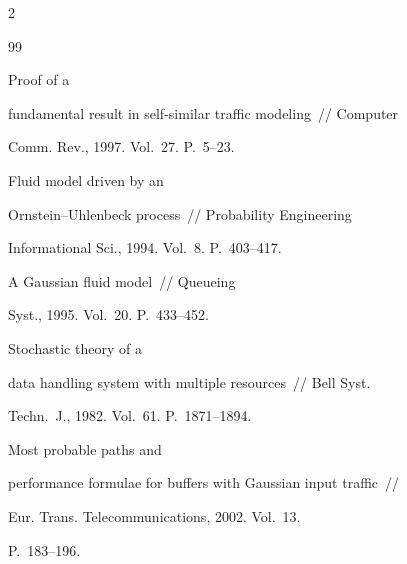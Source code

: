 \begin{multicols}{2}
{{\begin{thebibliography}{99}


 Proof of a


fundamental result in self-similar traffic modeling~// Computer


Comm. Rev., 1997. Vol.~27. P.~5--23.










 Fluid model driven by an


Ornstein--Uhlenbeck process~// Probability  Engineering 


Informational Sci., 1994. Vol.~8. P.~403--417.







 A Gaussian fluid model~// Queueing


Syst., 1995. Vol.~20. P.~433--452.







 Stochastic theory of a


data handling system with multiple resources~// Bell Syst.


Techn.~J., 1982. Vol.~61. P.~1871--1894.





\label{end\stat}







 Most probable paths and


performance formulae for buffers with Gaussian input traffic~//


Eur. Trans. Telecommunications, 2002. Vol.~13.


P.~183--196.


\end{thebibliography}


}


}





\end{multicols}


